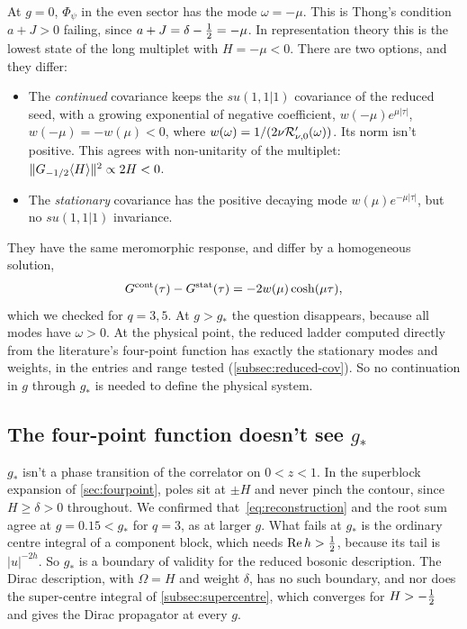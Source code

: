 At $g=0$, $\Phi_\psi$ in the even sector has the mode $\omega=-\mu$. This is Thong's condition $a+J>0$ failing, since $a+J=\delta-\tfrac12=-\mu$. In representation theory this is the lowest state of the long multiplet with $H=-\mu<0$. There are two options, and they differ:
\begin{itemize}
\item The \emph{continued} covariance keeps the $su(1,1|1)$ covariance of the reduced seed, with a growing exponential of negative coefficient, $w(-\mu)e^{\mu|\tau|}$, $w(-\mu)=-w(\mu)<0$, where $w(\omega)=1/(2\nu\mathcal{R}'_{\nu,0}(\omega))$. Its norm isn't positive. This agrees with non-unitarity of the multiplet: $\|G_{-1/2}\langle H\rangle\|^2\propto2H<0$.
\item The \emph{stationary} covariance has the positive decaying mode $w(\mu)e^{-\mu|\tau|}$, but no $su(1,1|1)$ invariance.
\end{itemize}
They have the same meromorphic response, and differ by a homogeneous solution,
\begin{equation}\label{eq:homogeneous}
G^{\rm cont}(\tau)-G^{\rm stat}(\tau)=-2w(\mu)\cosh(\mu\tau),
\end{equation}
which we checked for $q=3,5$. At $g>g_*$ the question disappears, because all modes have $\omega>0$. At the physical point, the reduced ladder computed directly from the literature's four-point function has exactly the stationary modes and weights, in the entries and range tested (\cref{subsec:reduced-cov}). So no continuation in $g$ through $g_*$ is needed to define the physical system.

\subsection{The four-point function doesn't see $g_*$}

$g_*$ isn't a phase transition of the correlator on $0<z<1$. In the superblock expansion of \cref{sec:fourpoint}, poles sit at $\pm H$ and never pinch the contour, since $H\ge\delta>0$ throughout. We confirmed that~\eqref{eq:reconstruction} and the root sum agree at $g=0.15<g_*$ for $q=3$, as at larger $g$. What fails at $g_*$ is the ordinary centre integral of a component block, which needs $\mathrm{Re}\,h>\tfrac12$, because its tail is $|u|^{-2h}$. So $g_*$ is a boundary of validity for the reduced bosonic description. The Dirac description, with $\Omega=H$ and weight $\delta$, has no such boundary, and nor does the super-centre integral of \cref{subsec:supercentre}, which converges for $H>-\tfrac12$ and gives the Dirac propagator at every $g$.

